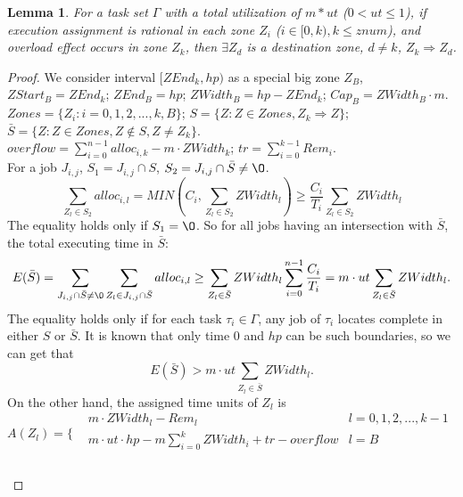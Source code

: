 \documentclass{article}
\begin{document}
\newtheorem{defi}{Definition}
\newtheorem{lemm}{Lemma}

\begin{lemm}
	For a task set $\Gamma$ with a total utilization of $m*ut$ ($0 < ut \leq 1$), 
	if execution assignment is rational in each zone $Z_i$ ($i \in [0, k), k \leq znum$), 
	and overload effect occurs in zone $Z_k$, 
	then $\exists Z_d$ is a destination zone, $d \ne k$, $Z_k \Rightarrow Z_d$.
\end{lemm}

\begin{proof}
	We consider interval $[ZEnd_k, hp)$ as a special big zone $Z_B$, $ZStart_B = ZEnd_k$; $ZEnd_B = hp$; $ZWidth_B = hp - ZEnd_k$; $Cap_B = ZWidth_B \cdot m$. \\ 
	$Zones = \{ Z_i : i = 0,1,2,...,k,B \}$; $S = \{ Z : Z \in Zones, Z_k \Rightarrow Z\}$; $\bar{S} = \{ Z : Z \in Zones, Z \notin S, Z \neq Z_k \}$. \\ 
	$overflow = \sum\limits_{i=0}^{n-1} alloc_{i,k} - m \cdot ZWidth_k$;
	$tr = \sum\limits_{i=0}^{k-1} Rem_i$. \\
	For a job $J_{i,j}$, $S_1 = J_{i,j} \cap S$, $S_2 = J_{i,j} \cap \bar{S} \neq \O$. 
	\[
		\sum\limits_{Z_l \in S_2} alloc_{i,l} = MIN(C_i, \sum\limits_{Z_l \in S_2} ZWidth_l) \geq \dfrac{C_i}{T_i} \sum\limits_{Z_l \in S_2} ZWidth_l	
	\]
	The equality holds only if $S_1 = \O$.
	So for all jobs having an intersection with $\bar{S}$, the total executing time in $\bar{S}$:
	\[
		E(\bar{S}) = \sum\limits_{J_{i,j} \cap \bar{S} \neq \O} \sum\limits_{Z_l \in J_{i,j} \cap \bar{S}} alloc_{i,l} \geq \sum\limits_{Z_l \in \bar{S}} ZWidth_l \sum\limits_{i=0}^{n-1} \dfrac{C_i}{T_i}
		= m \cdot ut \sum\limits_{Z_l \in \bar{S}} ZWidth_l.
	\]
	The equality holds only if for each task $\tau_i \in \Gamma$, any job of $\tau_i$ locates complete in either $S$ or $\bar{S}$. It is known that only time $0$ and $hp$ can be such boundaries, so we can get that
	\begin{equation}
		E(\bar{S}) > m \cdot ut \sum\limits_{Z_l \in \bar{S}} ZWidth_l \label{exp1}.
	\end{equation}
	On the other hand, the assigned time units of $Z_l$ is 
	\[
		A(Z_l) = \{
			\begin{aligned}
				& m \cdot ZWidth_l - Rem_l & l = 0, 1, 2, ..., k-1 & \\
				& m \cdot ut \cdot hp - m \sum\limits_{i=0}^{k} ZWidth_i + tr -overflow & l = B & \\
			\end{aligned}
	\]
		\\

\end{proof}
\end{document}
